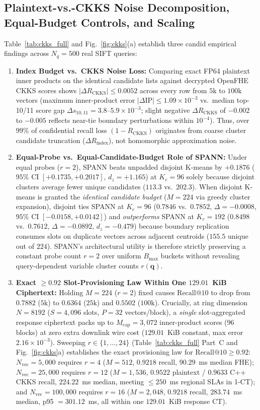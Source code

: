 \documentclass[10pt,journal,compsoc]{IEEEtran}
\begin{document}
\subsection{Plaintext-vs.-CKKS Noise Decomposition, Equal-Budget Controls, and Scaling}
Table~\ref{tab:ckks_full} and Fig.~\ref{fig:ckks}(a) establish three candid empirical findings across $N_q=500$ real SIFT queries:
\begin{enumerate}
    \item \textbf{Index Budget vs.\ CKKS Noise Loss:} Comparing exact FP64 plaintext inner products on the identical candidate lists against decrypted OpenFHE CKKS scores shows $|\Delta R_{\text{CKKS}}| \le 0.0052$ across every row from $5\text{k}$ to $100\text{k}$ vectors (maximum inner-product error $|\Delta\text{IP}| \le 1.09\times 10^{-3}$ vs.\ median top-10/11 score gap $\Delta s_{10,11} = 3.8\text{--}5.9\times 10^{-3}$; slight negative $\Delta R_{\text{CKKS}}$ of $-0.002$ to $-0.005$ reflects near-tie boundary perturbations within $10^{-4}$). Thus, over $99\%$ of confidential recall loss $(1 - R_{\text{CKKS}})$ originates from coarse cluster candidate truncation ($\Delta R_{\text{index}}$), not homomorphic approximation noise.
    \item \textbf{Equal-Probe vs.\ Equal-Candidate-Budget Role of SPANN:} Under equal probes ($r=2$), SPANN beats unpadded disjoint K-means by $+0.1876$ ($95\%$ CI $[+0.1735,+0.2017]$, $d_z=+1.165$) at $K_c=96$ solely because disjoint clusters average fewer unique candidates ($113.3$ vs.\ $202.3$). When disjoint K-means is granted the \emph{identical candidate budget} ($M=224$ via greedy cluster expansion), disjoint ties SPANN at $K_c=96$ ($0.7846$ vs.\ $0.7852$, $\Delta = -0.0008$, $95\%$ CI $[-0.0158,+0.0142]$) and \emph{outperforms} SPANN at $K_c=192$ ($0.8498$ vs.\ $0.7612$, $\Delta = -0.0892$, $d_z=-0.479$) because boundary replication consumes slots on duplicate vectors across adjacent centroids ($155.5$ unique out of $224$). SPANN's architectural utility is therefore strictly preserving a constant probe count $r=2$ over uniform $B_{\max}$ buckets without revealing query-dependent variable cluster counts $r(\mathbf{q})$.
    \item \textbf{Exact $\ge 0.92$ Slot-Provisioning Law Within One $129.01$~KiB Ciphertext:} Holding $M=224$ ($r=2$) fixed causes $\mathrm{Recall}@10$ to drop from $0.7882$ ($5\text{k}$) to $0.6364$ ($25\text{k}$) and $0.5502$ ($100\text{k}$). Crucially, at ring dimension $N=8192$ ($S=4{,}096$ slots, $P=32$ vectors/block), a \emph{single} slot-aggregated response ciphertext packs up to $M_{\text{cap}}=3{,}072$ inner-product scores ($96$ blocks) at zero extra downlink wire cost ($129.01$~KiB constant, max error $2.16\times 10^{-3}$). Sweeping $r \in \{1,\dots,24\}$ (Table~\ref{tab:ckks_full} Part~C and Fig.~\ref{fig:ckks}a) establishes the exact provisioning law for $\mathrm{Recall}@10 \ge 0.92$: $N_{\text{vec}}=5{,}000$ requires $r=4$ ($M=512$, $0.9218$ recall, $90.29$~ms median FHE); $N_{\text{vec}}=25{,}000$ requires $r=12$ ($M=1{,}536$, $0.9522$ plaintext / $0.9633$ C++ CKKS recall, $224.22$~ms median, meeting $\le 250$~ms regional SLAs in 1-CT); and $N_{\text{vec}}=100{,}000$ requires $r=16$ ($M=2{,}048$, $0.9218$ recall, $283.74$~ms median, p95 $= 301.12$~ms, all within one $129.01$~KiB response CT).

\end{enumerate}
\end{document}
